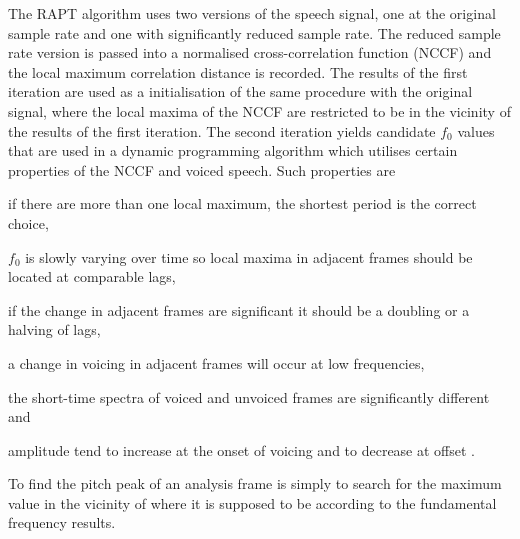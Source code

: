 The RAPT algorithm uses two versions of the speech signal, one at the original sample rate and one with significantly reduced sample rate. The reduced sample rate version is passed into a normalised cross-correlation function (NCCF) and the local maximum correlation distance is recorded. The results of the first iteration are used as a initialisation of the same procedure with the original signal, where the local maxima of the NCCF are restricted to be in the vicinity of the results of the first iteration. The second iteration yields candidate $f_0$ values that are used in a dynamic programming algorithm which utilises certain properties of the NCCF and voiced speech. Such properties are \begin{inparaenum} \item if there are more than one local maximum, the shortest period is the correct choice, \item $f_0$ is slowly varying over time so local maxima in adjacent frames should be located at comparable lags, \item if the change in adjacent frames are significant it should be a doubling or a halving of lags, \item a change in voicing in adjacent frames will occur at low frequencies, \item the short-time spectra of voiced and unvoiced frames are significantly different and \item amplitude tend to increase at the onset of voicing and to decrease at offset \cite{talkin95}.\end{inparaenum}

To find the pitch peak of an analysis frame is simply to search for the maximum value in the vicinity of where it is supposed to be according to the fundamental frequency results.


